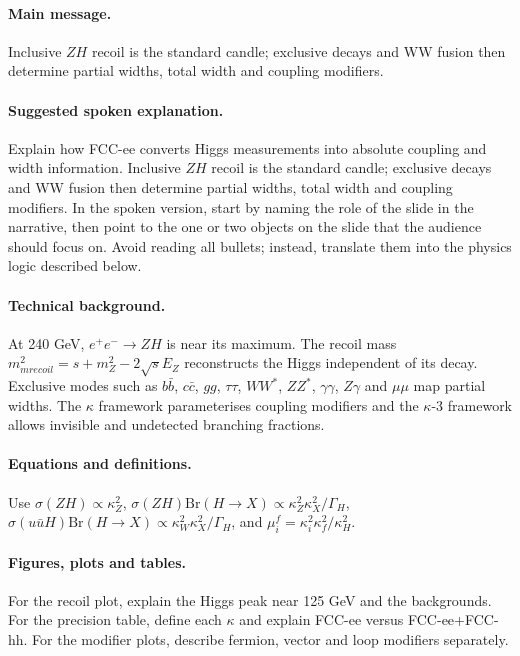 \documentclass[11pt,a4paper]{report}
\newcommand{\ee}{e^+e^-}
\newcommand{\br}{\mathrm{Br}}
\begin{document}
\paragraph{Main message.}
Inclusive $ZH$ recoil is the standard candle; exclusive decays and WW fusion then determine partial widths, total width and coupling modifiers.

\paragraph{Suggested spoken explanation.}
Explain how FCC-ee converts Higgs measurements into absolute coupling and width information. Inclusive $ZH$ recoil is the standard candle; exclusive decays and WW fusion then determine partial widths, total width and coupling modifiers. In the spoken version, start by naming the role of the slide in the narrative, then point to the one or two objects on the slide that the audience should focus on.  Avoid reading all bullets; instead, translate them into the physics logic described below.

\paragraph{Technical background.}
At 240 GeV, $\ee\to ZH$ is near its maximum.  The recoil mass $m_{
m recoil}^2=s+m_Z^2-2\sqrt{s}E_Z$ reconstructs the Higgs independent of its decay.  Exclusive modes such as $b\bar b$, $c\bar c$, $gg$, $\tau\tau$, $WW^*$, $ZZ^*$, $\gamma\gamma$, $Z\gamma$ and $\mu\mu$ map partial widths.  The $\kappa$ framework parameterises coupling modifiers and the $\kappa$-3 framework allows invisible and undetected branching fractions.

\paragraph{Equations and definitions.}
Use $\sigma(ZH)\propto \kappa_Z^2$, $\sigma(ZH)\br(H\to X)\propto \kappa_Z^2\kappa_X^2/\Gamma_H$, $\sigma(
u\bar
u H)\br(H\to X)\propto \kappa_W^2\kappa_X^2/\Gamma_H$, and $\mu_i^f=\kappa_i^2\kappa_f^2/\kappa_H^2$.

\paragraph{Figures, plots and tables.}
For the recoil plot, explain the Higgs peak near 125 GeV and the backgrounds.  For the precision table, define each $\kappa$ and explain FCC-ee versus FCC-ee+FCC-hh.  For the modifier plots, describe fermion, vector and loop modifiers separately.
\end{document}
